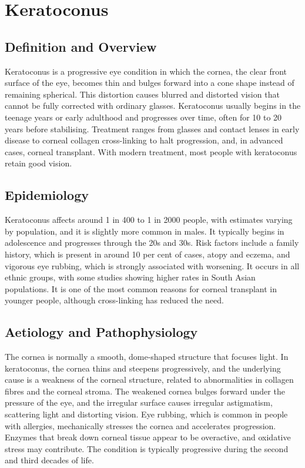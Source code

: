 \chapter{Keratoconus}

\section*{Definition and Overview}
Keratoconus is a progressive eye condition in which the cornea, the clear front surface of the eye, becomes thin and bulges forward into a cone shape instead of remaining spherical. This distortion causes blurred and distorted vision that cannot be fully corrected with ordinary glasses. Keratoconus usually begins in the teenage years or early adulthood and progresses over time, often for 10 to 20 years before stabilising. Treatment ranges from glasses and contact lenses in early disease to corneal collagen cross-linking to halt progression, and, in advanced cases, corneal transplant. With modern treatment, most people with keratoconus retain good vision.

\section*{Epidemiology}
Keratoconus affects around 1 in 400 to 1 in 2000 people, with estimates varying by population, and it is slightly more common in males. It typically begins in adolescence and progresses through the 20s and 30s. Risk factors include a family history, which is present in around 10 per cent of cases, atopy and eczema, and vigorous eye rubbing, which is strongly associated with worsening. It occurs in all ethnic groups, with some studies showing higher rates in South Asian populations. It is one of the most common reasons for corneal transplant in younger people, although cross-linking has reduced the need.

\section*{Aetiology and Pathophysiology}
The cornea is normally a smooth, dome-shaped structure that focuses light. In keratoconus, the cornea thins and steepens progressively, and the underlying cause is a weakness of the corneal structure, related to abnormalities in collagen fibres and the corneal stroma. The weakened cornea bulges forward under the pressure of the eye, and the irregular surface causes irregular astigmatism, scattering light and distorting vision. Eye rubbing, which is common in people with allergies, mechanically stresses the cornea and accelerates progression. Enzymes that break down corneal tissue appear to be overactive, and oxidative stress may contribute. The condition is typically progressive during the second and third decades of life.


